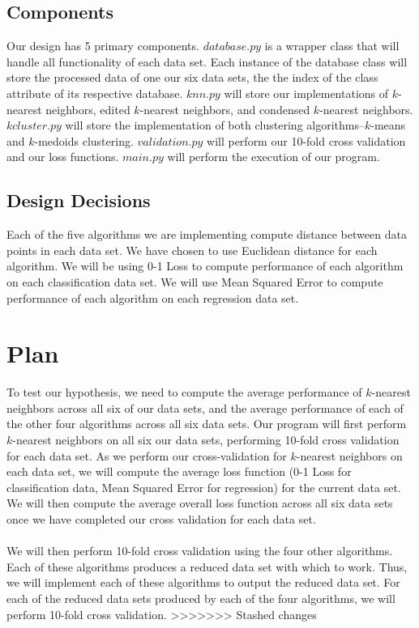 \documentclass{article}
\begin{document}
\subsection*{Components}
Our design has 5 primary components. $database.py$ is a wrapper class that will handle all functionality of each data set. Each instance of the database class will store the processed data of one our six data sets, the the index of the class attribute of its respective database. $knn.py$ will store our implementations of $k$-nearest neighbors, edited $k$-nearest neighbors, and condensed $k$-nearest neighbors. $kcluster.py$ will store the implementation of both clustering algorithms--$k$-means and $k$-medoids clustering. $validation.py$ will perform our 10-fold cross validation and our loss functions. $main.py$ will perform the execution of our program. 
\subsection*{Design Decisions}
Each of the five algorithms we are implementing compute distance between data points in each data set. We have chosen to use Euclidean distance for each algorithm. We will be using 0-1 Loss to compute performance of each algorithm on each classification data set. We will use Mean Squared Error to compute performance of each algorithm on each regression data set. %
\section{Plan}
To test our hypothesis, we need to compute the average performance of $k$-nearest neighbors across all six of our data sets, and the average performance of each of the other four algorithms across all six data sets. Our program will first perform $k$-nearest neighbors on all six our data sets, performing 10-fold cross validation for each data set. As we perform our cross-validation for $k$-nearest neighbors on each data set, we will compute the average loss function (0-1 Loss for classification data, Mean Squared Error for regression) for the current data set. We will then compute the average overall loss function across all six data sets once we have completed our cross validation for each data set. \\ \\
We will then perform 10-fold cross validation using the four other algorithms. Each of these algorithms produces a reduced data set with which to work. Thus, we will implement each of these algorithms to output the reduced data set. For each of the reduced data sets produced by each of the four algorithms, we will perform 10-fold cross validation.
>>>>>>> Stashed changes
\end{document}
